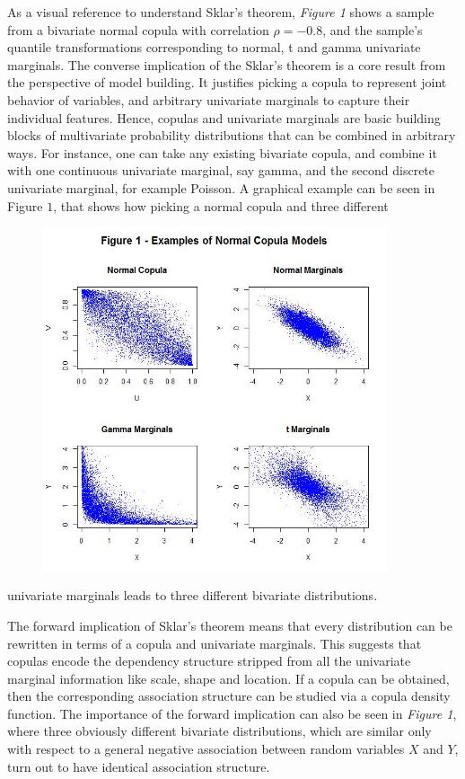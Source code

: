 \documentclass[12pt]{article}
\begin{document}
	As a visual reference to understand Sklar’s theorem, \emph{Figure 1} shows a sample from a bivariate normal copula with correlation $\rho = -0.8$, and the sample’s quantile transformations corresponding to normal, t and gamma univariate marginals. The converse implication of the Sklar’s theorem is a core result from the perspective of model building. It justifies picking a copula to represent joint behavior of variables, and arbitrary univariate marginals to capture their individual features. Hence, copulas and univariate marginals are basic building blocks of multivariate probability distributions that can be combined in arbitrary ways. For instance, one can take any existing bivariate copula, and combine it with one continuous univariate marginal, say gamma, and the second discrete univariate marginal, for example Poisson. A graphical example can be seen in Figure $1$, that shows how picking a normal copula and three different 
\begin{figure}
\centering
\includegraphics[width=0.9\textwidth]{copulas}
\end{figure}
univariate marginals leads to three different bivariate distributions.

	The forward implication of Sklar’s theorem means that every distribution can be rewritten in terms of a copula and univariate marginals. This suggests that copulas encode the dependency structure stripped from all the univariate marginal information like scale, shape and location. If a copula can be obtained, then the corresponding association structure can be studied via a copula density function. The importance of the forward implication can also be seen in \emph{Figure 1}, where three obviously different bivariate distributions, which are similar only with respect to a general negative association between random variables $X$ and $Y$, turn out to have identical association structure.
    
\end{document}
